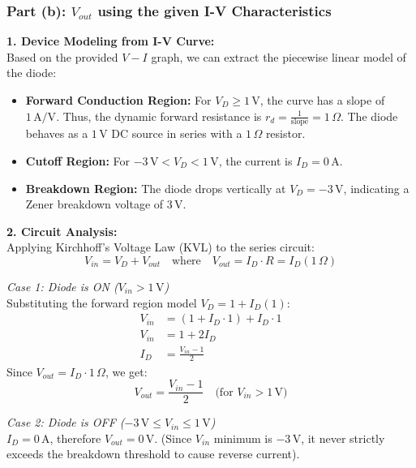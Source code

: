 \documentclass[12pt,a3paper]{article}
\begin{document}
\begin{enumerate}
\begin{tcolorbox}[enhanced,breakable,ansbox,colback=cA!4,colframe=cA,boxrule=0.8pt,arc=5pt,title={\textbf{Answer}},fonttitle=\bfseries\color{white},colbacktitle=cA]
\vspace{0.5em}
\hrulefill
\vspace{0.5em}

\subsubsection*{Part (b): $V_{out}$ using the given I-V Characteristics}

\textbf{1. Device Modeling from I-V Curve:}\\
Based on the provided $V-I$ graph, we can extract the piecewise linear model of the diode:
\begin{itemize}
    \item \textbf{Forward Conduction Region:} For $V_D \ge 1\,\text{V}$, the curve has a slope of $1\,\text{A/V}$. Thus, the dynamic forward resistance is $r_d = \frac{1}{\text{slope}} = 1\,\Omega$. The diode behaves as a $1\,\text{V}$ DC source in series with a $1\,\Omega$ resistor.
    \item \textbf{Cutoff Region:} For $-3\,\text{V} < V_D < 1\,\text{V}$, the current is $I_D = 0\,\text{A}$.
    \item \textbf{Breakdown Region:} The diode drops vertically at $V_D = -3\,\text{V}$, indicating a Zener breakdown voltage of $3\,\text{V}$.
\end{itemize}

\textbf{2. Circuit Analysis:}\\
Applying Kirchhoff's Voltage Law (KVL) to the series circuit:
\begin{equation*}
    V_{in} = V_D + V_{out} \quad \text{where} \quad V_{out} = I_D \cdot R = I_D (1\,\Omega)
\end{equation*}

\textit{Case 1: Diode is ON ($V_{in} > 1\,\text{V}$)}\\
Substituting the forward region model $V_D = 1 + I_D(1)$:
\begin{align*}
    V_{in} &= (1 + I_D \cdot 1) + I_D \cdot 1 \\
    V_{in} &= 1 + 2 I_D \\
    I_D &= \frac{V_{in} - 1}{2}
\end{align*}
Since $V_{out} = I_D \cdot 1\,\Omega$, we get:
\begin{equation*}
    V_{out} = \frac{V_{in} - 1}{2} \quad \text{(for } V_{in} > 1\,\text{V})
\end{equation*}

\textit{Case 2: Diode is OFF ($-3\,\text{V} \le V_{in} \le 1\,\text{V}$)}\\
$I_D = 0\,\text{A}$, therefore $V_{out} = 0\,\text{V}$. (Since $V_{in}$ minimum is $-3\,\text{V}$, it never strictly exceeds the breakdown threshold to cause reverse current).


\end{tcolorbox}
\end{enumerate}
\end{document}
